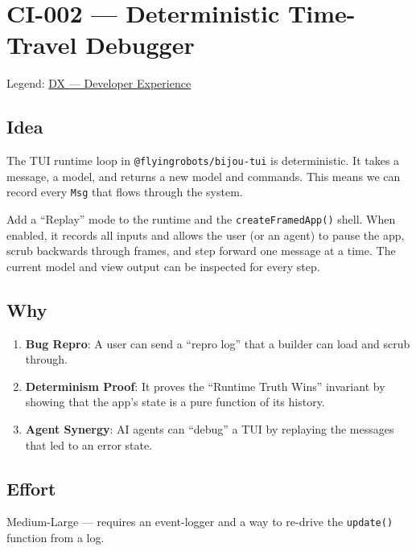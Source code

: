 \chapter{CI-002 --- Deterministic Time-Travel Debugger}\label{record-286}

\smallskip

Legend: \href{https://github.com/flyingrobots/bijou/blob/cbd70612140e7a450d764b3c7be1c6af878b99bc/docs/method/graveyard/legends/DX-developer-experience.md}{DX --- Developer Experience}

\section{Idea}\label{record-286-idea}

The TUI runtime loop in \texttt{@\allowbreak{}f\allowbreak{}l\allowbreak{}y\allowbreak{}i\allowbreak{}n\allowbreak{}g\allowbreak{}r\allowbreak{}o\allowbreak{}b\allowbreak{}o\allowbreak{}t\allowbreak{}s\allowbreak{}/\allowbreak{}b\allowbreak{}i\allowbreak{}j\allowbreak{}o\allowbreak{}u\allowbreak{}-\allowbreak{}t\allowbreak{}u\allowbreak{}i} is deterministic. It takes a message, a model, and returns a new model and commands. This means we can record every \texttt{M\allowbreak{}s\allowbreak{}g} that flows through the system.

Add a ``Replay'' mode to the runtime and the \texttt{c\allowbreak{}r\allowbreak{}e\allowbreak{}a\allowbreak{}t\allowbreak{}e\allowbreak{}F\allowbreak{}r\allowbreak{}a\allowbreak{}m\allowbreak{}e\allowbreak{}d\allowbreak{}A\allowbreak{}p\allowbreak{}p\allowbreak{}(\allowbreak{})} shell. When enabled, it records all inputs and allows the user (or an agent) to pause the app, scrub backwards through frames, and step forward one message at a time. The current model and view output can be inspected for every step.

\section{Why}\label{record-286-why}

\begin{enumerate}
\def\labelenumi{\arabic{enumi}.}
\tightlist
\item
  \textbf{Bug Repro}: A user can send a ``repro log'' that a builder can load and scrub through.
\item
  \textbf{Determinism Proof}: It proves the ``Runtime Truth Wins'' invariant by showing that the app's state is a pure function of its history.
\item
  \textbf{Agent Synergy}: AI agents can ``debug'' a TUI by replaying the messages that led to an error state.
\end{enumerate}

\section{Effort}\label{record-286-effort}

Medium-Large --- requires an event-logger and a way to re-drive the \texttt{u\allowbreak{}p\allowbreak{}d\allowbreak{}a\allowbreak{}t\allowbreak{}e\allowbreak{}(\allowbreak{})} function from a log.

